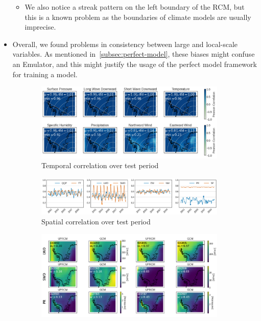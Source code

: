 \documentclass[a4paper,11pt,oneside]{report}
\begin{document}
\begin{itemize}
\begin{itemize}
        \item We also notice a streak pattern on the left boundary of the RCM, but this is a known problem as the boundaries of climate models are usually imprecise. 
    \end{itemize}
    \item Overall, we found problems in consistency between large and local-scale variables. As mentioned in~\ref{subsec:perfect-model}, these biases might confuse an Emulator, and this might justify the usage of the perfect model framework for training a model. 
\end{itemize}


\begin{figure}[tbp]
        \centering
        \begin{subfigure}[b]{\columnwidth}
            \centering \includegraphics[width=\textwidth]{doc/Thesis-latex/images/results/temporalCorr_RCM_GCM.pdf}
            \caption[]%
            {{\small Temporal correlation over test period}}    
          \label{fig:temp-corr-GCM-UPRCM}
        \end{subfigure}
        \hfill
            \begin{subfigure}[b]{\columnwidth}
            \centering \includegraphics[width=\textwidth]{doc/Thesis-latex/images/results/spatialCorr_TS_RCM_GCM.pdf}
            \caption[]%
            {{\small Spatial correlation over test period}}    
          \label{fig:spatial-corr-GCM-UPRCM}
        \end{subfigure}
        \hfill
        \begin{subfigure}[b]{\columnwidth}  
            \centering 
            \includegraphics[width=\textwidth]{doc/Thesis-latex/images/results/spatialCorr_RCM_GCM.pdf}

\end{subfigure}
\end{figure}
\end{document}

